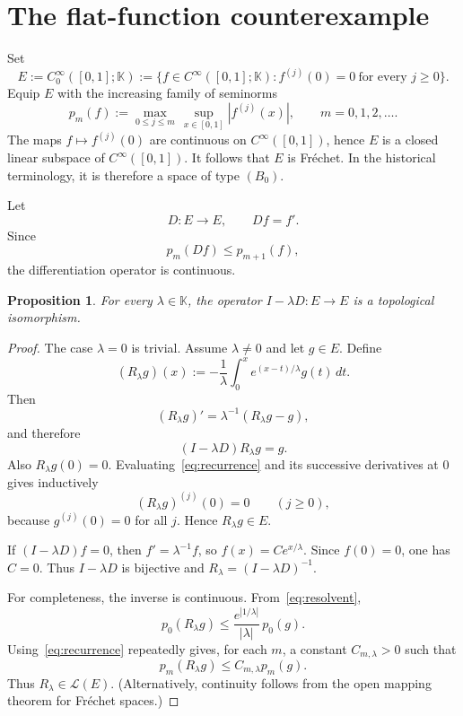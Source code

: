 \documentclass[11pt]{article}
\newtheorem{proposition}[theorem]{Proposition}
\theoremstyle{remark}
\newcommand{\K}{\mathbb K}
\newcommand{\Lcal}{\mathcal L}
\begin{document}
\section{The flat-function counterexample}

Set
\[
 E:=C_{0}^{\infty}([0,1];\K)
 :=\bigl\{f\in C^{\infty}([0,1];\K): f^{(j)}(0)=0\ \text{for every }j\ge0\bigr\}.
\]
Equip $E$ with the increasing family of seminorms
\[
 p_m(f):=\max_{0\le j\le m}\,\sup_{x\in[0,1]}|f^{(j)}(x)|,
 \qquad m=0,1,2,\dots .
\]
The maps $f\mapsto f^{(j)}(0)$ are continuous on $C^{\infty}([0,1])$, hence $E$ is a
closed linear subspace of $C^{\infty}([0,1])$.  It follows that $E$ is Fr\'echet.  In the
historical terminology, it is therefore a space of type $(B_0)$.

Let
\[
   D:E\longrightarrow E,\qquad Df=f'.
\]
Since
\[
 p_m(Df)\le p_{m+1}(f),
\]
the differentiation operator is continuous.

\begin{proposition}\label{prop:invertible}
For every $\lambda\in\K$, the operator $I-\lambda D:E\to E$ is a topological
isomorphism.
\end{proposition}

\begin{proof}
The case $\lambda=0$ is trivial.  Assume $\lambda\neq0$ and let $g\in E$.  Define
\begin{equation}\label{eq:resolvent}
  (R_\lambda g)(x)
   :=-\frac1\lambda\int_0^x e^{(x-t)/\lambda}g(t)\,dt.
\end{equation}
Then
\begin{equation}\label{eq:recurrence}
 (R_\lambda g)'=\lambda^{-1}(R_\lambda g-g),
\end{equation}
and therefore
\[
 (I-\lambda D)R_\lambda g=g.
\]
Also $R_\lambda g(0)=0$.  Evaluating~\eqref{eq:recurrence} and its successive
derivatives at $0$ gives inductively
\[
   (R_\lambda g)^{(j)}(0)=0\qquad(j\ge0),
\]
because $g^{(j)}(0)=0$ for all $j$.  Hence $R_\lambda g\in E$.

If $(I-\lambda D)f=0$, then $f'=\lambda^{-1}f$, so
$f(x)=Ce^{x/\lambda}$.  Since $f(0)=0$, one has $C=0$.  Thus $I-\lambda D$ is
bijective and $R_\lambda=(I-\lambda D)^{-1}$.

For completeness, the inverse is continuous.  From~\eqref{eq:resolvent},
\[
 p_0(R_\lambda g)
 \le \frac{e^{|1/\lambda|}}{|\lambda|}\,p_0(g).
\]
Using~\eqref{eq:recurrence} repeatedly gives, for each $m$, a constant
$C_{m,\lambda}>0$ such that
\[
 p_m(R_\lambda g)\le C_{m,\lambda}p_m(g).
\]
Thus $R_\lambda\in\Lcal(E)$.  (Alternatively, continuity follows from the open mapping
theorem for Fr\'echet spaces.)
\end{proof}
\end{document}
